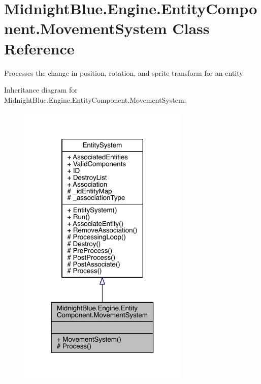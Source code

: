 \hypertarget{class_midnight_blue_1_1_engine_1_1_entity_component_1_1_movement_system}{}\section{Midnight\+Blue.\+Engine.\+Entity\+Component.\+Movement\+System Class Reference}
\label{class_midnight_blue_1_1_engine_1_1_entity_component_1_1_movement_system}


Processes the change in position, rotation, and sprite transform for an entity  




Inheritance diagram for Midnight\+Blue.\+Engine.\+Entity\+Component.\+Movement\+System\+:
\nopagebreak
\begin{figure}[H]
\begin{center}
\leavevmode
\includegraphics[width=231pt]{class_midnight_blue_1_1_engine_1_1_entity_component_1_1_movement_system__inherit__graph}
\end{center}
\end{figure}


